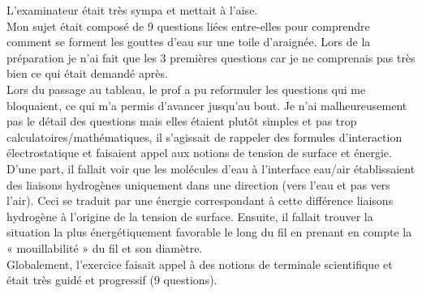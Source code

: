 \lettrine{{\color{violet} \oldpilcrowfive}}{}
L’examinateur était très sympa et mettait à l’aise.\\
Mon sujet était composé de 9 questions liées entre-elles pour comprendre comment se forment les gouttes d’eau sur une toile d’araignée. Lors de la préparation je n’ai fait que les 3 premières questions car je ne comprenais pas très bien ce qui était demandé après.\\
Lors du passage au tableau, le prof a pu reformuler les questions qui me bloquaient, ce qui m’a permis d’avancer jusqu’au bout.
Je n’ai malheureusement pas le détail des questions mais elles étaient plutôt simples et pas trop calculatoires/mathématiques, il s’agissait de rappeler des formules d’interaction électrostatique et faisaient appel aux notions de tension de surface et énergie.\\
D’une part, il fallait voir que les molécules d’eau à l’interface eau/air établissaient des liaisons hydrogènes uniquement dans une direction (vers l’eau et pas vers l’air). Ceci se traduit par une énergie correspondant à cette différence liaisons hydrogène à l’origine de la tension de surface. Ensuite, il fallait trouver la situation la plus énergétiquement favorable le long du fil en prenant en compte la « mouillabilité » du fil et son diamètre.\\
Globalement, l’exercice faisait appel à des notions de terminale scientifique et était très guidé et progressif (9 questions).\\

